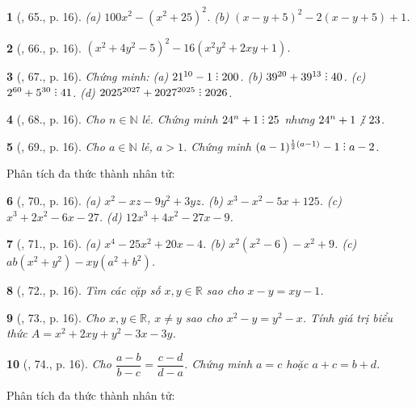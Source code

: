 \documentclass{article}
\newtheorem{baitoan}{}
\DeclareRobustCommand{\divby}{%
	\mathrel{\vbox{\baselineskip.65ex\lineskiplimit0pt\hbox{.}\hbox{.}\hbox{.}}}%
}
\begin{document}
\begin{baitoan}[\cite{Tuyen_Toan_8}, 65., p. 16]
    (a) $100x^2 - (x^2 + 25)^2$. (b) $(x - y + 5)^2 - 2(x - y + 5) + 1$.
\end{baitoan}

\begin{baitoan}[\cite{Tuyen_Toan_8}, 66., p. 16]
	$(x^2 + 4y^2 - 5)^2 - 16(x^2y^2 + 2xy + 1)$.
\end{baitoan}

\begin{baitoan}[\cite{Tuyen_Toan_8}, 67., p. 16]
	Chứng minh: (a) $21^{10} - 1\divby200$. (b) $39^{20} + 39^{13}\divby40$. (c) $2^{60} + 5^{30}\divby41$. (d) $2025^{2027} + 2027^{2025}\divby2026$.
\end{baitoan}

\begin{baitoan}[\cite{Tuyen_Toan_8}, 68., p. 16]
	Cho $n\in\mathbb{N}$ lẻ. Chứng minh $24^n + 1\divby25$ nhưng $24^n + 1\not{\divby}\ 23$.
\end{baitoan}

\begin{baitoan}[\cite{Tuyen_Toan_8}, 69., p. 16]
	Cho $a\in\mathbb{N}$ lẻ, $a > 1$. Chứng minh $(a - 1)^{\frac{1}{2}(a - 1)} - 1\divby a - 2$.
\end{baitoan}
Phân tích đa thức thành nhân tử:

\begin{baitoan}[\cite{Tuyen_Toan_8}, 70., p. 16]
	(a) $x^2 - xz - 9y^2 + 3yz$. (b) $x^3 - x^2 - 5x + 125$. (c) $x^3 + 2x^2 - 6x - 27$. (d) $12x^3 + 4x^2 - 27x - 9$.
\end{baitoan}

\begin{baitoan}[\cite{Tuyen_Toan_8}, 71., p. 16]
	(a) $x^4 - 25x^2 + 20x - 4$. (b) $x^2(x^2 - 6) - x^2 + 9$. (c) $ab(x^2 + y^2) - xy(a^2 + b^2)$.
\end{baitoan}

\begin{baitoan}[\cite{Tuyen_Toan_8}, 72., p. 16]
	Tìm các cặp số $x,y\in\mathbb{R}$ sao cho $x - y = xy - 1$.
\end{baitoan}

\begin{baitoan}[\cite{Tuyen_Toan_8}, 73., p. 16]
	Cho $x,y\in\mathbb{R}$, $x\ne y$ sao cho $x^2 - y = y^2 - x$. Tính giá trị biểu thức $A = x^2 + 2xy + y^2 - 3x - 3y$.
\end{baitoan}

\begin{baitoan}[\cite{Tuyen_Toan_8}, 74., p. 16]
	Cho $\dfrac{a - b}{b - c} = \dfrac{c - d}{d - a}$. Chứng minh $a = c$ hoặc $a + c = b + d$.
\end{baitoan}
Phân tích đa thức thành nhân tử:
\end{document}
